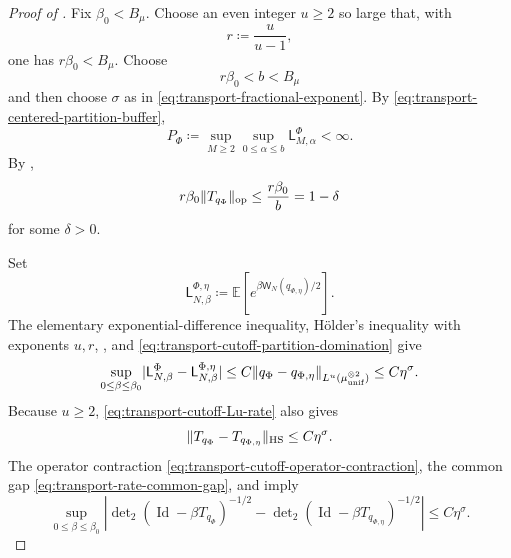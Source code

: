 \documentclass[11pt,reqno]{amsart}
\numberwithin{equation}{section}
\theoremstyle{plain}
\theoremstyle{definition}
\DeclarePairedDelimiter{\abs}{\lvert}{\rvert}
\DeclarePairedDelimiter{\norm}{\lVert}{\rVert}
\newcommand{\E}{\mathbb E}
\newcommand{\Id}{\operatorname{Id}}
\newcommand{\HS}{\mathrm{HS}}
\newcommand{\op}{\mathrm{op}}
\newcommand{\be}{\beta}
\newcommand{\al}{\alpha}
\newcommand{\muunif}{\mu_{\mathrm{unif}}}
\begin{document}
\begin{proof}[Proof of ]
Fix $\be_0<B_\mu$.  Choose an even integer $u\geq2$ so large that, with
\begin{equation}
 r\coloneqq\frac{u}{u-1},
 \label{eq:transport-rate-holder-conjugate}
\end{equation}
one has $r\be_0<B_\mu$.  Choose
\begin{equation}
 r\be_0<b<B_\mu
 \label{eq:transport-rate-buffer-choice}
\end{equation}
and then choose $\sigma$ as in \eqref{eq:transport-fractional-exponent}.  By \eqref{eq:transport-centered-partition-buffer},
\begin{equation}
 P_\Phi\coloneqq\sup_{M\geq2}\sup_{0\leq\al\leq b}
 \mathsf L_{M,\al}^{\Phi}<\infty.
 \label{eq:transport-centered-buffer-constant}
\end{equation}
By ,
\begin{equation}
 r\be_0\norm{T_{q_\Phi}}_{\op}
 \leq\frac{r\be_0}{b}
 =1-\delta
 \label{eq:transport-rate-common-gap}
\end{equation}
for some $\delta>0$.

Set
\begin{equation}
 \mathsf L_{N,\be}^{\Phi,\eta}
 \coloneqq\E\left[e^{\be\mathsf W_N(q_{\Phi,\eta})/2}\right].
 \label{eq:transport-regularized-centered-partition}
\end{equation}
The elementary exponential-difference inequality, H\"older's inequality with exponents $u,r$, , and \eqref{eq:transport-cutoff-partition-domination} give
\begin{equation}
 \sup_{0\leq\be\leq\be_0}
 \abs{\mathsf L_{N,\be}^{\Phi}-\mathsf L_{N,\be}^{\Phi,\eta}}
 \leq C\norm{q_\Phi-q_{\Phi,\eta}}_{L^u(\muunif^{\otimes2})}
 \leq C\eta^\sigma.
 \label{eq:transport-particle-cutoff-error}
\end{equation}
Because $u\geq2$, \eqref{eq:transport-cutoff-Lu-rate} also gives
\begin{equation}
 \norm{T_{q_\Phi}-T_{q_{\Phi,\eta}}}_{\HS}
 \leq C\eta^\sigma.
 \label{eq:transport-HS-cutoff-error}
\end{equation}
The operator contraction \eqref{eq:transport-cutoff-operator-contraction}, the common gap \eqref{eq:transport-rate-common-gap}, and  imply
\begin{equation}
 \sup_{0\leq\be\leq\be_0}
 \left|\det\nolimits_2(\Id-\be T_{q_\Phi})^{-1/2}
 -\det\nolimits_2(\Id-\be T_{q_{\Phi,\eta}})^{-1/2}\right|
 \leq C\eta^\sigma.
 \label{eq:transport-determinant-cutoff-error}
\end{equation}


\end{proof}
\end{document}

